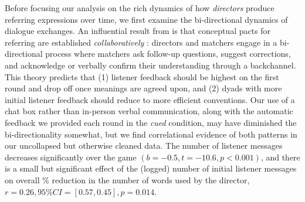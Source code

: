\documentclass[alpha-refs]{wiley-article}
\begin{document}
Before focusing our analysis on the rich dynamics of how \emph{directors} produce referring expressions over time, we first examine the bi-directional dynamics of dialogue exchanges. 
An influential result from is that conceptual pacts for referring are established \emph{collaboratively} \citet[see also \citealp{KraussWeinheimer66_Tangrams, GarrodFayLeeOberlanderMacLeod07_GraphicalSymbolSystems}]{clarkReferringCollaborativeProcess1986}: 
directors and matchers engage in a bi-directional process where matchers ask follow-up questions, suggest corrections, and acknowledge or verbally confirm their understanding through a backchannel. 
This theory predicts that (1) listener feedback should be highest on the first round and drop off once meanings are agreed upon, and (2) dyads with more initial listener feedback should reduce to more efficient conventions. 
Our use of a chat box rather than in-person verbal communication, along with the automatic feedback we provided each round in the \emph{cued} condition, may have diminished the bi-directionality somewhat, but we find correlational evidence of both patterns in our uncollapsed but otherwise cleaned data. 
The number of listener messages decreases significantly over the game $(b=-0.5, t = -10.6, p < 0.001)$, and there is a small but significant effect of the (logged) number of initial listener messages on overall \% reduction in the number of words used by the director, $r = 0.26, 95\% CI = [0.57, 0.45], p = 0.014$.
\end{document}
